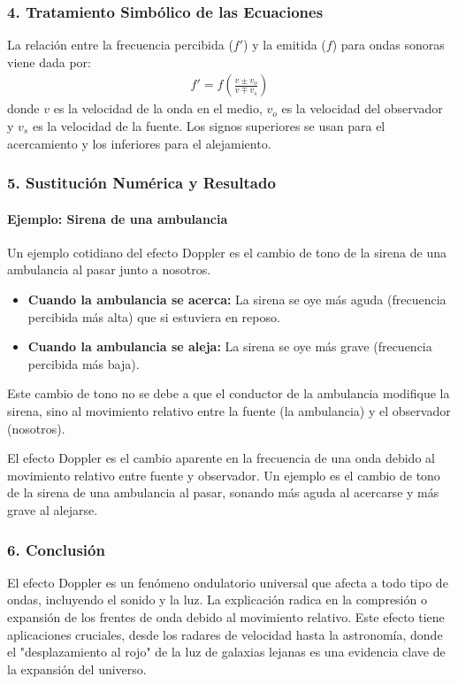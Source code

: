 \subsubsection*{4. Tratamiento Simbólico de las Ecuaciones}
La relación entre la frecuencia percibida ($f'$) y la emitida ($f$) para ondas sonoras viene dada por:
\begin{gather}
    f' = f \left( \frac{v \pm v_o}{v \mp v_s} \right)
\end{gather}
donde $v$ es la velocidad de la onda en el medio, $v_o$ es la velocidad del observador y $v_s$ es la velocidad de la fuente. Los signos superiores se usan para el acercamiento y los inferiores para el alejamiento.

\subsubsection*{5. Sustitución Numérica y Resultado}
\paragraph*{Ejemplo: Sirena de una ambulancia}
Un ejemplo cotidiano del efecto Doppler es el cambio de tono de la sirena de una ambulancia al pasar junto a nosotros.
\begin{itemize}
    \item \textbf{Cuando la ambulancia se acerca:} La sirena se oye más aguda (frecuencia percibida más alta) que si estuviera en reposo.
    \item \textbf{Cuando la ambulancia se aleja:} La sirena se oye más grave (frecuencia percibida más baja).
\end{itemize}
Este cambio de tono no se debe a que el conductor de la ambulancia modifique la sirena, sino al movimiento relativo entre la fuente (la ambulancia) y el observador (nosotros).

\begin{cajaresultado}
El efecto Doppler es el cambio aparente en la frecuencia de una onda debido al movimiento relativo entre fuente y observador. Un ejemplo es el cambio de tono de la sirena de una ambulancia al pasar, sonando más aguda al acercarse y más grave al alejarse.
\end{cajaresultado}

\subsubsection*{6. Conclusión}
\begin{cajaconclusion}
El efecto Doppler es un fenómeno ondulatorio universal que afecta a todo tipo de ondas, incluyendo el sonido y la luz. La explicación radica en la compresión o expansión de los frentes de onda debido al movimiento relativo. Este efecto tiene aplicaciones cruciales, desde los radares de velocidad hasta la astronomía, donde el "desplazamiento al rojo" de la luz de galaxias lejanas es una evidencia clave de la expansión del universo.
\end{cajaconclusion}
\newpage


